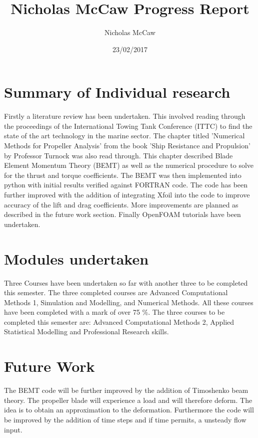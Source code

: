 \documentclass[10pt]{article}
\title{Nicholas McCaw Progress Report}
\author{Nicholas McCaw}
\date{23/02/2017}
\begin{document}
\maketitle

\section{Summary of Individual research }
Firstly a literature review has been undertaken. This involved reading through the proceedings of the International Towing Tank Conference (ITTC) to find the state of the art technology in the marine sector.  The chapter titled 'Numerical Methods for Propeller Analysis' from the book 'Ship Resistance and Propulsion' by Professor Turnock was also read through. This chapter described Blade Element Momentum Theory (BEMT) as well as the numerical procedure to solve for the thrust and torque coefficients. The BEMT was then implemented into python with initial results verified against FORTRAN code. The code has been further improved with the addition of integrating Xfoil into the code to improve accuracy of the lift and drag coefficients. More improvements are planned as described in the future work section. Finally OpenFOAM tutorials have been undertaken.


\section{Modules undertaken}

Three Courses have been undertaken so far with another three to be completed this semester. The three completed courses are Advanced Computational Methods 1, Simulation and Modelling, and Numerical Methods. All these courses have been completed with a mark of over 75 \%. The three courses to be completed this semester are: Advanced Computational Methods 2, Applied Statistical Modelling and Professional Research skills.

\section{Future Work}

The BEMT code will be further improved by the addition of Timoshenko beam theory. The propeller blade will experience a load and will therefore deform. The idea is to obtain an approximation to the deformation. Furthermore the code will be improved by the addition of time steps and if time permits, a unsteady flow input.
\end{document}
